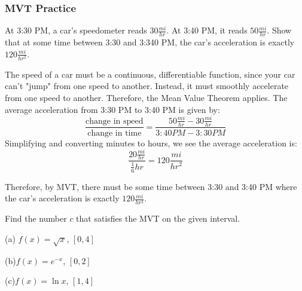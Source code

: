 \subsubsection{MVT Practice}
\begin{Exercise}
[label=MVT1]
At 3:30 PM, a car's speedometer reads $30 \frac{mi}{hr}$. At 3:40 PM, it reads 
$50\frac{mi}{hr}$. Show that at some time between 3:30 and 3:340 PM, the car's 
acceleration is exactly $120 \frac{mi}{hr^2}$. 
\end{Exercise}
\begin{Answer}
[ref=MVT1]
The speed of a car must be a continuous, differentiable function, since your car 
can't "jump" from one speed to another. Instead, it must smoothly accelerate from one 
speed to another. Therefore, the Mean Value Theorem applies. The average 
acceleration from 3:30 PM to 3:40 PM is given by:
$$\frac{\text{change in speed}}{\text{change in time}} = \frac{50 \frac{mi}{hr}
 - 30\frac{mi}{hr}}{3:40PM - 3:30PM}$$ 
Simplifying and converting minutes to hours, we see the average acceleration is:
$$\frac{20\frac{mi}{hr}}{\frac{1}{6}hr} = 120\frac{mi}{hr^2}$$

Therefore, by MVT, there must be some time between 3:30 and 3:40 PM where the 
car's acceleration is exactly $120 \frac{mi}{hr^2}$. 
\end{Answer}

\begin{Exercise}
[label=MVT2]
Find the number $c$ that satisfies the MVT on the given interval. 

(a) $f(x) = \sqrt{x}$, $[0, 4]$

(b)$f(x) = e^{-x}$, $[0,2]$

(c)$f(x) = \ln{x}$, $[1,4]$	
\end{Exercise}

